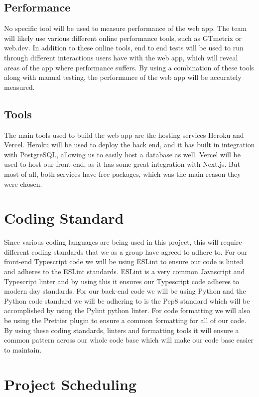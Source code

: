 \documentclass{article}
\begin{document}
\subsection{Performance}

No specific tool will be used to measure performance of the web app. The team will likely use various different online performance tools, such as GTmetrix or web.dev. In addition to these online tools, end to end tests will be used to run through different interactions users have with the web app, which will reveal areas of the app where performance suffers. By using a combination of these tools along with manual testing, the performance of the web app will be accurately measured.

\subsection{Tools}

The main tools used to build the web app are the hosting services Heroku and Vercel. Heroku will be used to deploy the back end, and it has built in integration with PostgreSQL, allowing us to easily host a database as well. Vercel will be used to host our front end, as it has some great integration with Next.js. But most of all, both services have free packages, which was the main reason they were chosen.

\section{Coding Standard}

Since various coding languages are being used in this project, this will require different coding standards that we as a group have agreed to adhere to. For our front-end Typescript code we will be using ESLint to ensure our code is linted and adheres to the ESLint standards. ESLint is a very common Javascript and Typescript linter and by using this it ensures our Typescript code adheres to modern day standards. For our back-end code we will be using Python and the Python code standard we will be adhering to is the Pep8 standard which will be accomplished by using the Pylint python linter. For code formatting we will also be using the Prettier plugin to ensure a common formatting for all of our code. By using these coding standards, linters and formatting tools it will ensure a common pattern across our whole code base which will make our code base easier to maintain.

\section{Project Scheduling}
\end{document}

